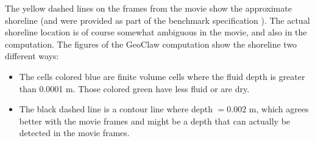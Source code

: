 The yellow dashed lines on the frames from the movie show the approximate
shoreline (and were provided as part of the benchmark specification
\cite{bp7description}).  The actual shoreline location is of course somewhat
ambiguous in the movie, and also in the computation.  The figures of the
GeoClaw computation show the shoreline two different ways:
\begin{itemize}
\item The cells colored blue are finite volume cells where the fluid depth is
greater than 0.0001 m. Those colored green have less fluid or are dry.
\item The black dashed line is a contour line where depth $= 0.002$ m, which
agrees better with the movie frames and might be a depth that can actually be
detected in the movie frames.
\end{itemize} 

